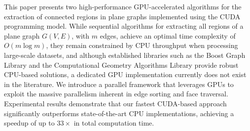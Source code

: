 This paper presents two high-performance GPU-accelerated algorithms for the extraction of connected regions in plane graphs implemented using the CUDA programming model. While sequential algorithms for extracting all regions of a plane graph $G(V, E)$, with $m$ edges, achieve an optimal time complexity of $O(m \log m)$, they remain constrained by CPU throughput when processing large-scale datasets, and although established libraries such as the Boost Graph Library and the Computational Geometry Algorithms Library provide robust CPU-based solutions, a dedicated GPU implementation currently does not exist in the literature. We introduce a parallel framework that leverages GPUs to exploit the massive parallelism inherent in edge sorting and face traversal.  Experimental results demonstrate that our fastest CUDA-based approach significantly outperforms state-of-the-art CPU implementations, achieving a speedup of up to $33\times$ in total computation time.